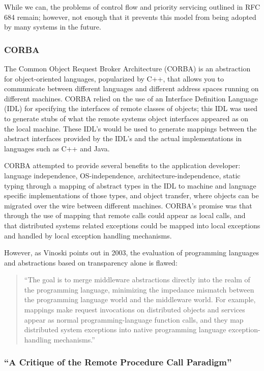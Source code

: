 While we can, the problems of control flow and priority servicing outlined in RFC 684 remain; however, not enough that it prevents this model from being adopted by many systems in the future.

\subsubsection{CORBA}

The Common Object Request Broker Architecture (CORBA) is an abstraction for object-oriented languages, popularized by C++, that allows you to communicate between different languages and different address spaces running on different machines.  CORBA relied on the use of an Interface Definition Language (IDL) for specifying the interfaces of remote classes of objects; this IDL was used to generate stubs of what the remote systems object interfaces appeared as on the local machine.  These IDL's would be used to generate mappings between the abstract interfaces provided by the IDL's and the actual implementations in languages such as C++ and Java.

CORBA attempted to provide several benefits to the application developer: language independence, OS-independence, architecture-independence, static typing through a mapping of abstract types in the IDL to machine and language specific implementations of those types, and object transfer, where objects can be migrated  over the wire between different machines.  CORBA's promise was that through the use of mapping that remote calls could appear as local calls, and that distributed systems related exceptions could be mapped into local exceptions and handled by local exception handling mechanisms.  

However, as Vinoski points out in 2003, the evaluation of programming languages and abstractions based on transparency alone is flawed:

\begin{quote}
``The goal is to merge middleware abstractions directly into the realm of the programming language, minimizing the impedance mismatch between the programming language world and the middleware world. For example, mappings make request invocations on distributed objects and services appear as normal programming-language function calls, and they map distributed system exceptions into native programming language exception-handling mechanisms.''~\cite{vinoski2003s}
\end{quote}

\subsubsection{``A Critique of the Remote Procedure Call Paradigm''}

